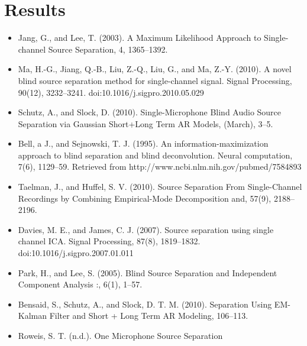\documentclass[11pt, oneside, a4paper]{article}
\begin{document}
\section {Results}
\begin{itemize}
	\item Jang, G., and Lee, T. (2003). A Maximum Likelihood Approach to Single-channel Source Separation, 4, 1365–1392.
	\item Ma, H.-G., Jiang, Q.-B., Liu, Z.-Q., Liu, G., and Ma, Z.-Y. (2010). A novel blind source separation method for single-channel signal. Signal Processing, 90(12), 3232–3241. doi:10.1016/j.sigpro.2010.05.029 
	\item Schutz, A., and Slock, D. (2010). Single-Microphone Blind Audio Source Separation via Gaussian Short+Long Term AR Models, (March), 3–5.
	\item Bell, a J., and Sejnowski, T. J. (1995). An information-maximization approach to blind separation and blind deconvolution. Neural computation, 7(6), 1129–59. Retrieved from http://www.ncbi.nlm.nih.gov/pubmed/7584893 
	\item Taelman, J., and Huffel, S. V. (2010). Source Separation From Single-Channel Recordings by Combining Empirical-Mode Decomposition and, 57(9), 2188–2196.
	\item Davies, M. E., and James, C. J. (2007). Source separation using single channel ICA. Signal Processing, 87(8), 1819–1832. doi:10.1016/j.sigpro.2007.01.011
	\item Park, H., and Lee, S. (2005). Blind Source Separation and Independent Component Analysis :, 6(1), 1–57.
	\item Bensaid, S., Schutz, A., and Slock, D. T. M. (2010). Separation Using EM-Kalman Filter and Short + Long Term AR Modeling, 106–113.
	\item Roweis, S. T. (n.d.). One Microphone Source Separation
\end{itemize}
\end{document}
